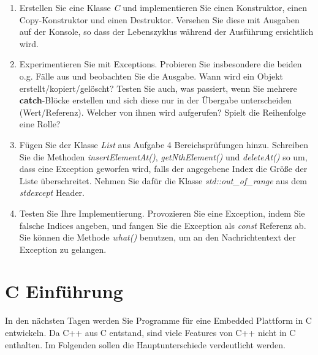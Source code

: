 \documentclass[
  accentcolor=tud1c,	%
  colorbacktitle,		%
  inverttitle,			%
  german,				%
  twoside
]{tudexercise}
\begin{document}
\begin{enumerate}
\item Erstellen Sie eine Klasse \emph{C} und implementieren Sie einen Konstruktor, einen Copy-Konstruktor und einen Destruktor. Versehen Sie diese mit Ausgaben auf der Konsole, so dass der Lebenszyklus während der Ausführung ersichtlich wird.

\item Experimentieren Sie mit Exceptions. Probieren Sie insbesondere die beiden o.g. Fälle aus und beobachten Sie die Ausgabe. Wann wird ein Objekt erstellt/kopiert/gelöscht? Testen Sie auch, was passiert, wenn Sie mehrere \textbf{catch}-Blöcke erstellen und sich diese nur in der Übergabe unterscheiden (Wert/Referenz). Welcher von ihnen wird aufgerufen? Spielt die Reihenfolge eine Rolle?

\item Fügen Sie der Klasse \emph{List} aus Aufgabe 4 Bereichsprüfungen hinzu. Schreiben Sie die Methoden \emph{insertElementAt()}, \emph{getNthElement()} und \emph{deleteAt()} so um, dass eine Exception geworfen wird, falls der angegebene Index die Größe der Liste überschreitet. Nehmen Sie dafür die Klasse \emph{std::out\_of\_range} aus dem \emph{stdexcept} Header.

\item Testen Sie Ihre Implementierung. Provozieren Sie eine Exception, indem Sie falsche Indices angeben, und fangen Sie die Exception als \emph{const} Referenz ab. Sie können die Methode \emph{what()} benutzen, um an den Nachrichtentext der Exception zu gelangen.

\end{enumerate}

\section{C Einführung}
In den nächsten Tagen werden Sie Programme für eine Embedded Plattform in C entwickeln. Da C++ aus C entstand, sind viele Features von C++ nicht in C enthalten. Im Folgenden sollen die Hauptunterschiede verdeutlicht werden.
\end{document}
